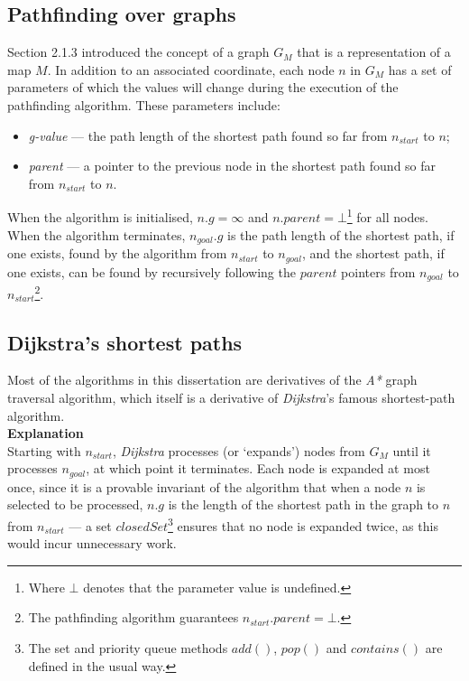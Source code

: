 \documentclass[12pt,notitlepage]{report}
\begin{document}
\subsection{Pathfinding over graphs}

\noindent
Section 2.1.3 introduced the concept of a graph $G_{M}$ that is a representation of a map $M$. In addition to an associated coordinate, each node $n$ in $G_{M}$ has a set of parameters of which the values will change during the execution of the pathfinding algorithm. These parameters include:
\begin{itemize}
\item {\em g-value} --- the path length of the shortest path found so far from $n_{start}$ to $n$;
\item {\em parent} --- a pointer to the previous node in the shortest path found so far from $n_{start}$ to $n$.
\end{itemize}

\noindent
When the algorithm is initialised, $n.g = \infty$ and $n.parent = \bot$\footnote{Where $\bot$ denotes that the parameter value is undefined.} for all nodes.\\

\noindent
When the algorithm terminates, $n_{goal}.g$ is the path length of the shortest path, if one exists, found by the algorithm from $n_{start}$ to $n_{goal}$, and the shortest path, if one exists, can be found by recursively following the $parent$ pointers from $n_{goal}$ to $n_{start}$\footnote{The pathfinding algorithm guarantees $n_{start}.parent = \bot$.}.

\subsection {Dijkstra's shortest paths}

Most of the algorithms in this dissertation are derivatives of the {\em A*} graph traversal algorithm, which itself is a derivative of {\em Dijkstra}'s famous shortest-path algorithm.\\

\noindent
{\bf Explanation}\\
\noindent
Starting with $n_{start}$, {\em Dijkstra} processes (or `expands') nodes from $G_{M}$ until it processes $n_{goal}$, at which point it terminates. Each node is expanded at most once, since it is a provable\cite{CormenDijkstra} invariant of the algorithm that when a node $n$ is selected to be processed, $n.g$ is the length of the shortest path in the graph to $n$ from $n_{start}$ --- a set $closedSet$\footnote{The set and priority queue methods $add()$, $pop()$ and  $contains()$ are defined in the usual way.} ensures that no node is expanded twice, as this would incur unnecessary work.\\
\end{document}
